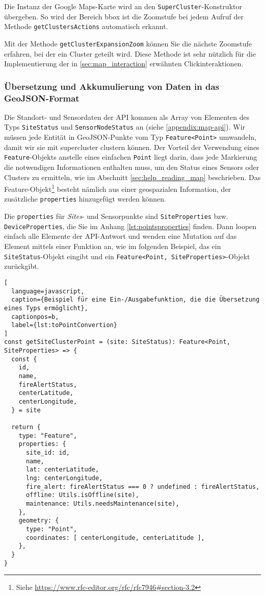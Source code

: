 Die Instanz der Google Maps-Karte wird an den \lstinline{SuperCluster}-Konstruktor übergeben.
So wird der Bereich bbox ist die Zoomstufe bei jedem Aufruf der Methode \lstinline{getClustersActions} automatisch erkannt.

Mit der Methode \lstinline{getClusterExpansionZoom} können Sie die nächste Zoomstufe erfahren, bei der ein Cluster geteilt wird.
Diese Methode ist sehr nützlich für die Implementierung der in \ref{sec:map_interaction} erwähnten Clickinteraktionen.

\subsubsection{Übersetzung und Akkumulierung von Daten in das GeoJSON-Format}

Die Standort- und Sensordaten der API kommen als Array von Elementen des Typs \lstinline{SiteStatus} und \lstinline{SensorNodeStatus} an (siehe \ref{appendix:map-api}).
Wir müssen jede Entität in GeoJSON-Punkte vom Typ \lstinline{Feature<Point>} umwandeln, damit wir sie mit supercluster clustern können.
Der Vorteil der Verwendung eines \lstinline{Feature}-Objekts anstelle eines einfachen \lstinline{Point} liegt darin, dass jede Markierung die notwendigen Informationen enthalten muss, um den Status eines Sensors oder Clusters zu ermitteln, wie im Abschnitt \ref{sec:help_reading_map} beschrieben.
Das Feature-Objekt\footnote{Siehe \href{https://www.rfc-editor.org/rfc/rfc7946\#section-3.2}{https://www.rfc-editor.org/rfc/rfc7946\#section-3.2}} besteht nämlich aus einer geospazialen Information, der zusätzliche \lstinline{properties} hinzugefügt werden können.

Die \lstinline{properties} für \textit{Sites}- und Sensorpunkte sind \lstinline{SiteProperties} bzw. \lstinline{DeviceProperties}, die Sie im Anhang \ref{lst:pointsproperties} finden.
Dann loopen einfach alle Elemente der API-Antwort und wenden eine Mutation auf das Element mittels einer Funktion an, wie im folgenden Beispiel, das ein \lstinline{SiteStatus}-Objekt eingibt und ein \lstinline{Feature<Point, SiteProperties>}-Objekt zurückgibt.

\begin{lstlisting}[
  language=javascript,
  caption={Beispiel für eine Ein-/Ausgabefunktion, die die Übersetzung eines Typs ermöglicht},
  captionpos=b,
  label={lst:toPointConvertion}
]
const getSiteClusterPoint = (site: SiteStatus): Feature<Point, SiteProperties> => {
  const {
    id,
    name,
    fireAlertStatus,
    centerLatitude,
    centerLongitude,
  } = site

  return {
    type: "Feature",
    properties: {
      site_id: id,
      name,
      lat: centerLatitude,
      lng: centerLongitude,
      fire_alert: fireAlertStatus === 0 ? undefined : fireAlertStatus,
      offline: Utils.isOffline(site),
      maintenance: Utils.needsMaintenance(site),
    },
    geometry: {
      type: "Point",
      coordinates: [ centerLongitude, centerLatitude ],
    },
  }
}
\end{lstlisting}

